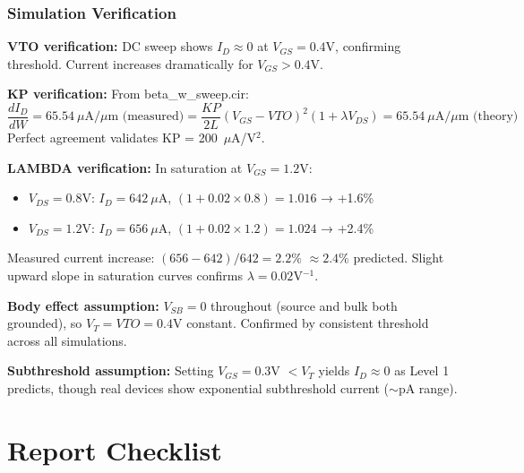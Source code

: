 \documentclass[a4paper,12pt]{article}
\begin{document}
\subsubsection{Simulation Verification}

\textbf{VTO verification:} DC sweep shows $I_D \approx 0$ at $V_{GS} = 0.4$V, confirming threshold. Current increases dramatically for $V_{GS} > 0.4$V.

\textbf{KP verification:} From beta\_w\_sweep.cir:
\begin{equation}
\frac{dI_D}{dW} = 65.54~\mu\text{A}/\mu\text{m (measured)} = \frac{KP}{2L}(V_{GS}-VTO)^2(1+\lambda V_{DS}) = 65.54~\mu\text{A}/\mu\text{m (theory)}
\end{equation}
Perfect agreement validates KP = 200~$\mu$A/V$^2$.

\textbf{LAMBDA verification:} In saturation at $V_{GS} = 1.2$V:
\begin{itemize}
    \item $V_{DS} = 0.8$V: $I_D = 642~\mu$A, $(1+0.02\times0.8) = 1.016$ → +1.6\%
    \item $V_{DS} = 1.2$V: $I_D = 656~\mu$A, $(1+0.02\times1.2) = 1.024$ → +2.4\%
\end{itemize}

Measured current increase: $(656-642)/642 = 2.2\%$ $\approx 2.4\%$ predicted. Slight upward slope in saturation curves confirms $\lambda = 0.02$V$^{-1}$.

\textbf{Body effect assumption:} $V_{SB} = 0$ throughout (source and bulk both grounded), so $V_T = VTO = 0.4$V constant. Confirmed by consistent threshold across all simulations.

\textbf{Subthreshold assumption:} Setting $V_{GS} = 0.3$V $< V_T$ yields $I_D \approx 0$ as Level 1 predicts, though real devices show exponential subthreshold current ($\sim$pA range).

\section{Report Checklist}
\end{document}
